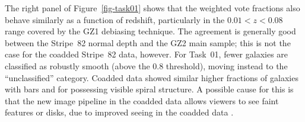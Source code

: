 \documentclass[useAMS,usenatbib]{mn2e}
\begin{document}
The right panel of Figure~\ref{fig-task01} shows that the weighted vote fractions also behave similarly as a function of redshift, particularly in the $0.01<z<0.08$ range covered by the GZ1 debiasing technique. The agreement is generally good between the Stripe~82 normal depth and the GZ2 main sample; this is not the case for the coadded Stripe~82 data, however. For Task~01, fewer galaxies are classified as robustly smooth (above the 0.8 threshold), moving instead to the ``unclassified'' category. Coadded data showed similar higher fractions of galaxies with bars and for possessing visible spiral structure. A possible cause for this is that the new image pipeline in the coadded data allows viewers to see faint features or disks, due to improved seeing in the coadded data \citep[from $1.4\arcsec$ to $1.1\arcsec$;][]{ann11}.

\end{document}
